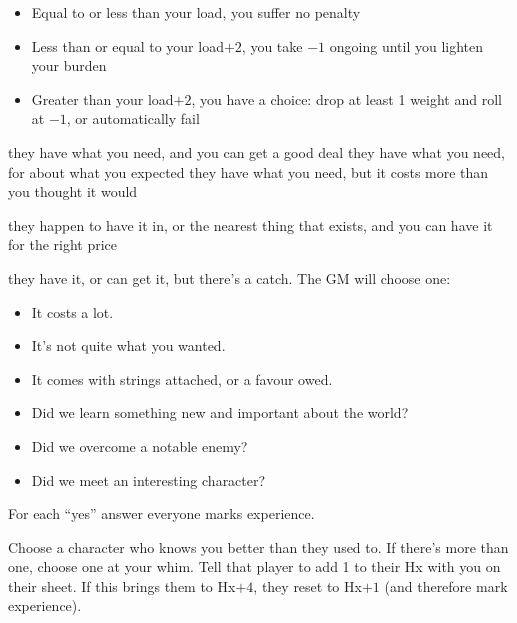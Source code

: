 

\begin{itemize}
\item Equal to or less than your load, you suffer no penalty
\item Less than or equal to your load$+2$, you take $-1$ ongoing until you lighten your burden
\item Greater than your load$+2$, you have a choice: drop at least 1 weight and roll at $-1$, or automatically fail
\end{itemize}

{they have what you need, and you can get a good deal}
{they have what you need, for about what you expected}
{they have what you need, but it costs more than you thought it would}

{they happen to have it in, or the nearest thing that exists, and you can have it for the right price}
{they have it, or can get it, but there's a catch. The GM will choose one:
\begin{itemize}
\item It costs a lot.
\item It's not quite what you wanted.
\item It comes with strings attached, or a favour owed.
\end{itemize}}

\begin{itemize}
\item Did we learn something new and important about the world?
\item Did we overcome a notable enemy?
\item Did we meet an interesting character?
\end{itemize}

For each ``yes'' answer everyone marks experience.

Choose a character who knows you better than they used to. If there's
more than one, choose one at your whim. Tell that player to add 1 to
their Hx with you on their sheet. If this brings them to Hx$+4$, they
reset to Hx$+1$ (and therefore mark experience).
